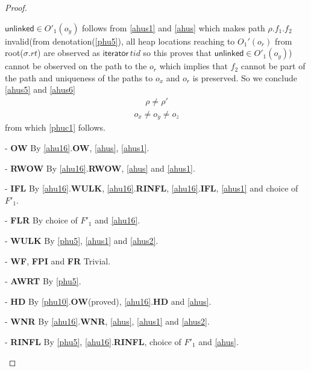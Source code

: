 \begin{proof}
\begin{case}
$\textsf{unlinked}\in O'_1(o_y)$ follows from \ref{ahus1} and \ref{ahus} which makes path $\rho.f_1.f_2$ invalid(from denotation(\ref{phu5}), all heap locations reaching to  $O_1'(o_r)$ from root($\sigma.rt$) are observed as  $\textsf{iterator}\, tid$ so this proves that  $\textsf{unlinked}\in O'_1(o_y)$)  cannot be observed on the path to the $o_r$ which implies that $f_2$ cannot be part of the path and uniqueness of the paths to $o_x$ and $o_r$ is preserved. So we conclude \ref{ahus5} and \ref{ahus6}
  \begin{gather}\label{ahus5}
    \rho \neq \rho'
  \end{gather}
    \begin{gather}\label{ahus6}
    o_x \neq o_y \neq o_z 
  \end{gather}
from which \ref{phuc1} follows.
\end{case}
\begin{case} - \textbf{OW} By \ref{ahu16}.\textbf{OW}, \ref{ahus}, \ref{ahus1}.
\end{case}
\begin{case} - \textbf{RWOW} By \ref{ahu16}.\textbf{RWOW}, \ref{ahus} and \ref{ahus1}.
\end{case}
\begin{case} - \textbf{IFL} By \ref{ahu16}.\textbf{WULK}, \ref{ahu16}.\textbf{RINFL}, \ref{ahu16}.\textbf{IFL}, \ref{ahus1} and choice of $F'_1$.
\end{case}
\begin{case} - \textbf{FLR} By choice of $F'_1$ and \ref{ahu16}. 
\end{case}
\begin{case} - \textbf{WULK} By \ref{phu5},  \ref{ahus1} and \ref{ahus2}.
\end{case}
\begin{case} - \textbf{WF}, \textbf{FPI} and \textbf{FR} Trivial.
\end{case}
\begin{case} - \textbf{AWRT} By \ref{phu5}.
\end{case}
\begin{case} - \textbf{HD} By \ref{phu10}.\textbf{OW}(proved), \ref{ahu16}.\textbf{HD}  and \ref{ahus}. 
\end{case}
\begin{case} - \textbf{WNR} By \ref{ahu16}.\textbf{WNR}, \ref{ahus}, \ref{ahus1} and \ref{ahus2}.
\end{case}
\begin{case} - \textbf{RINFL} By \ref{phu5}, \ref{ahu16}.\textbf{RINFL}, choice of $F'_1$ and \ref{ahus}.

\end{case}
\end{proof}
